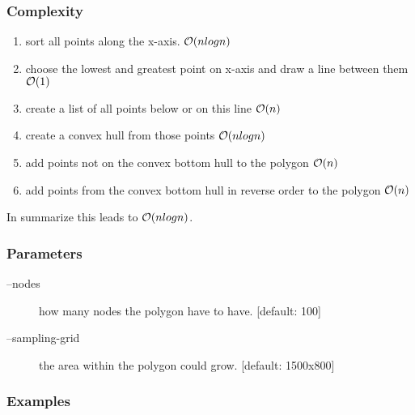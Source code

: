 \subsubsection{Complexity}
\begin{enumerate}
  \item sort all points along the x-axis. $\mathcal{O}(nlogn)$
  \item choose the lowest and greatest point on x-axis and draw a line between them $\mathcal{O}(1)$
  \item create a list of all points below or on this line $\mathcal{O}(n)$
  \item create a convex hull from those points $\mathcal{O}(nlogn)$
  \item add points not on the convex bottom hull to the polygon $\mathcal{O}(n)$
  \item add points from the convex bottom hull in reverse order to the polygon $\mathcal{O}(n)$
\end{enumerate}
In summarize this leads to $\mathcal{O}(nlogn)$.

\subsubsection{Parameters}
\begin{description}
  \item [--nodes] how many nodes the polygon have to have. [default: 100]
  \item [--sampling-grid] the area within the polygon could grow. [default: 1500x800]
\end{description}

\subsubsection{Examples}

